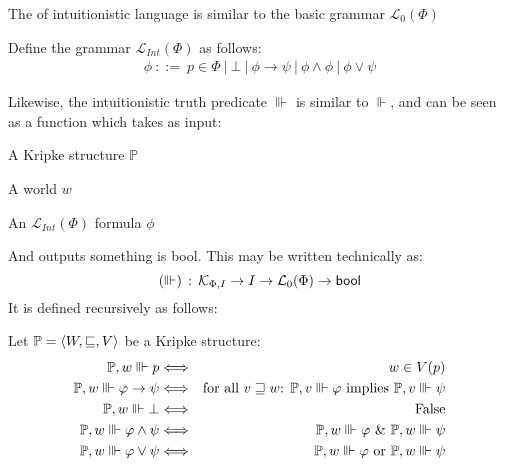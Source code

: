 The of intuitionistic language is similar to the basic grammar
$\mathcal{L}_0(\Phi)$

\begin{definition}
Define the grammar $\mathcal{L}_{Int}(\Phi)$ as follows:
\begin{eqnarray*}
& \phi\ {::=} \  p \in \Phi \ |\ \bot\ |\ \phi \to \psi \
|\ \phi \wedge \phi \ |\ \phi \vee \psi &\label{LI}
\end{eqnarray*}
\end{definition}

Likewise, the intuitionistic truth predicate $\Vvdash$ is similar to
$\Vdash$, and can be seen as a function which takes as input:
\begin{bul}
  \item A Kripke structure $\mathbb{P}$
  \item A world $w$
  \item An $\mathcal{L}_{Int}(\Phi)$ formula $\phi$
\end{bul}
And outputs something is \textsf{bool}.  This may be written
technically as:
\[ (\Vvdash) \colons \mathcal{K}_{\Phi, I} \to I \to
\mathcal{L}_0(\Phi) \to \text{\textsf{bool}}\]
It is defined recursively as follows:
\begin{definition}
  Let $\mathbbm{P} = \langle W, \sqsubseteq, V\rangle$ be a Kripke structure:
  \begin{eqnarray*}
    \mathbbm{P}, w \Vvdash p & \Longleftrightarrow & w \in V
    (p)\\
    \mathbbm{P}, w \Vvdash \phi \rightarrow \psi & \Longleftrightarrow &
    \textup{for all $v \sqsupseteq w$: }\mathbbm{P}, v \Vvdash \phi \text{ implies } \mathbbm{P}, v \Vvdash \psi\\
    \mathbbm{P}, w \Vvdash \bot & \Longleftrightarrow & \text{False}\\
    \mathbbm{P}, w \Vvdash \phi \wedge \psi & \Longleftrightarrow & 
\mathbbm{P}, w \Vvdash \phi  \textup{ \& } \mathbbm{P}, w \Vvdash \psi
\\
    \mathbbm{P}, w \Vvdash \phi \vee \psi & \Longleftrightarrow & 
\mathbbm{P}, w \Vvdash \phi \textup{ or } \mathbbm{P}, w \Vvdash \psi
  \end{eqnarray*}
\end{definition}

